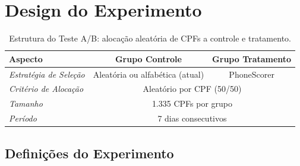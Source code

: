 \section{Design do Experimento}

\begin{table}[h]
\centering
\small
\begin{tabular}{|l|c|c|}
\hline
\textbf{Aspecto} & \textbf{Grupo Controle} & \textbf{Grupo Tratamento} \\
\hline
\textit{Estratégia de Seleção} & Aleatória ou alfabética (atual) & PhoneScorer \\
\hline
\textit{Critério de Alocação} & \multicolumn{2}{c|}{Aleatório por CPF (50/50)} \\
\hline
\textit{Tamanho} & \multicolumn{2}{c|}{1.335 CPFs por grupo} \\
\hline
\textit{Período} & \multicolumn{2}{c|}{7 dias consecutivos} \\
\hline
\end{tabular}
\caption{Estrutura do Teste A/B: alocação aleatória de CPFs a controle e tratamento.}
\label{tab:design_ab}
\end{table}

\subsection*{Definições do Experimento}


